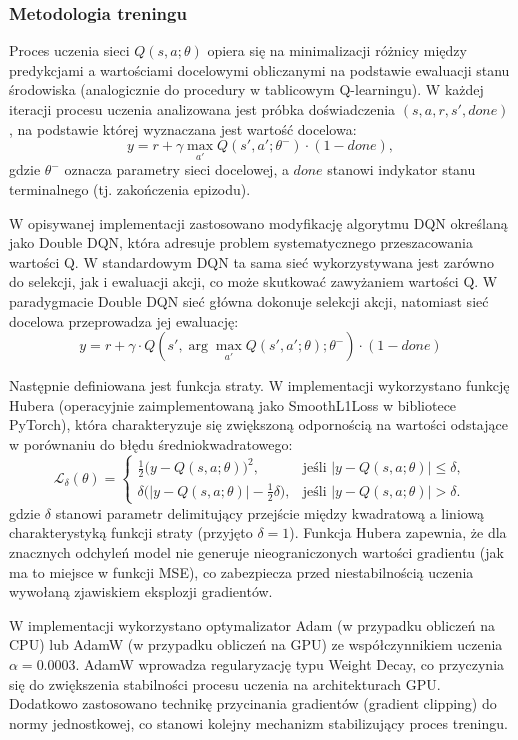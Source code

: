 \documentclass[a4paper,12pt]{article}
\begin{document}
\subsubsection*{Metodologia treningu}

Proces uczenia sieci \(Q(s,a;\theta)\) opiera się na minimalizacji różnicy między predykcjami a wartościami docelowymi obliczanymi na podstawie ewaluacji stanu środowiska (analogicznie do procedury w tablicowym Q-learningu). W każdej iteracji procesu uczenia analizowana jest próbka doświadczenia \((s,a,r,s',done)\), na podstawie której wyznaczana jest wartość docelowa:
\[
y = r + \gamma \max_{a'} Q(s',a';\theta^-) \cdot (1 - done),
\]
gdzie \(\theta^-\) oznacza parametry sieci docelowej, a \(done\) stanowi indykator stanu terminalnego (tj. zakończenia epizodu). 

W opisywanej implementacji zastosowano modyfikację algorytmu DQN określaną jako Double DQN, która adresuje problem systematycznego przeszacowania wartości Q. W standardowym DQN ta sama sieć wykorzystywana jest zarówno do selekcji, jak i ewaluacji akcji, co może skutkować zawyżaniem wartości Q. W paradygmacie Double DQN sieć główna dokonuje selekcji akcji, natomiast sieć docelowa przeprowadza jej ewaluację:
\[
y = r + \gamma \cdot Q(s', \arg\max_{a'} Q(s',a';\theta); \theta^-) \cdot (1 - done)
\]

Następnie definiowana jest funkcja straty. W implementacji wykorzystano funkcję Hubera (operacyjnie zaimplementowaną jako SmoothL1Loss w bibliotece PyTorch), która charakteryzuje się zwiększoną odpornością na wartości odstające w porównaniu do błędu średniokwadratowego:
\[
\mathcal{L}_\delta(\theta) =
\begin{cases}
\tfrac12\bigl(y - Q(s,a;\theta)\bigr)^2, & \text{jeśli } |y - Q(s,a;\theta)| \le \delta,\\
\delta\bigl(|y - Q(s,a;\theta)| - \tfrac12\delta\bigr), & \text{jeśli } |y - Q(s,a;\theta)| > \delta.
\end{cases}
\]
gdzie \(\delta\) stanowi parametr delimitujący przejście między kwadratową a liniową charakterystyką funkcji straty (przyjęto \(\delta=1\)). Funkcja Hubera zapewnia, że dla znacznych odchyleń model nie generuje nieograniczonych wartości gradientu (jak ma to miejsce w funkcji MSE), co zabezpiecza przed niestabilnością uczenia wywołaną zjawiskiem eksplozji gradientów. 

W implementacji wykorzystano optymalizator Adam (w przypadku obliczeń na CPU) lub AdamW (w przypadku obliczeń na GPU) ze współczynnikiem uczenia \(\alpha=0.0003\). AdamW wprowadza regularyzację typu Weight Decay, co przyczynia się do zwiększenia stabilności procesu uczenia na architekturach GPU. Dodatkowo zastosowano technikę przycinania gradientów (gradient clipping) do normy jednostkowej, co stanowi kolejny mechanizm stabilizujący proces treningu.
\end{document}

